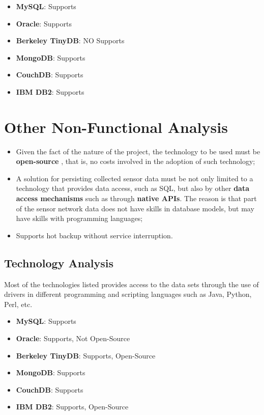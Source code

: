 \begin{itemize}
  \item \textbf{MySQL}: Supports
  \item \textbf{Oracle}: Supports
  \item \textbf{Berkeley TinyDB}: NO Supports
  \item \textbf{MongoDB}: Supports
  \item \textbf{CouchDB}: Supports
  \item \textbf{IBM DB2}: Supports
\end{itemize}

\section{Other Non-Functional Analysis}

\begin{itemize}
  \item Given the fact of the nature of the project, the technology to be used
  must be \textbf{open-source} \cite{open-source}, that is, no costs involved
  in the adoption of such technology;
  \item A solution for persisting collected sensor data must be not only limited
  to a technology that provides data access, such as SQL, but also by other
  \textbf{data access mechanisms} such as through \textbf{native APIs}. The
  reason is that part of the sensor network data does not have skills in
  database models, but may have skills with programming languages;
  \item Supports hot backup without service interruption.
\end{itemize}

\subsection{Technology Analysis}

Most of the technologies listed provides access to the data sets through the
use of drivers in different programming and scripting languages such as Java,
Python, Perl, etc.

\begin{itemize}
  \item \textbf{MySQL}: Supports
  \item \textbf{Oracle}: Supports, Not Open-Source
  \item \textbf{Berkeley TinyDB}: Supports, Open-Source
  \item \textbf{MongoDB}: Supports
  \item \textbf{CouchDB}: Supports
  \item \textbf{IBM DB2}: Supports, Open-Source
\end{itemize}

